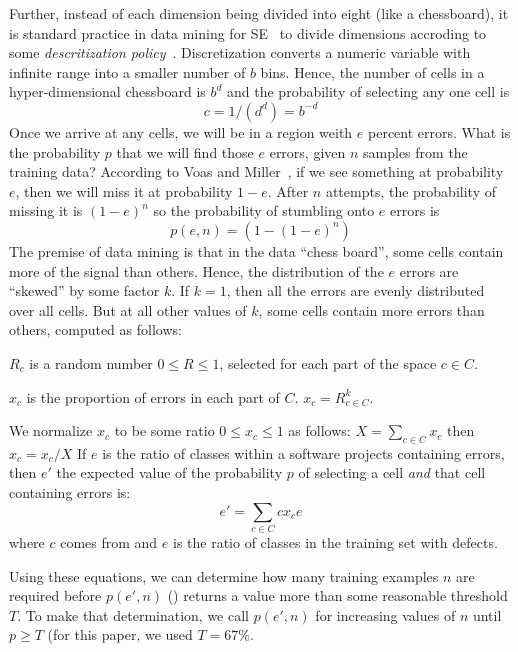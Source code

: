 Further,
instead of each dimension being divided into eight (like a chessboard), it is standard practice in data mining for SE~\cite{Menzies2014a}
to divide dimensions accroding to some {\em descritization policy}~\cite{lust08}.
Discretization converts a numeric variable with infinite range into a smaller number of  $b$ bins. Hence, the number of cells in a
hyper-dimensional chessboard is $b^d$ and the probability of selecting any one cell is
\begin{equation}\label{eq:c}c=1/(d^d)=b^{-d}\end{equation}
Once we arrive at any cells, we will be in a region weith $e$ percent errors.
What  is the probability $p$ that we will find those $e$ errors, given $n$ samples from the training data?
According to Voas and Miller~\cite{voas1995software},
if we see something at probability $e$, then we will miss it at probability $1-e$.
After $n$ attempts, the probability of missing it is $(1-e)^n$ so the probability of stumbling onto $e$ errors is
\begin{equation}\label{eq:p}
p(e,n) = (1-(1-e)^n)
\end{equation}
The premise of data mining is that in the data ``chess board'', some cells contain more of the signal than others. Hence, the 
distribution of the $e$ errors are ``skewed'' by some factor $k$. If $k=1$, then all the errors are evenly distributed over all cells.
But at all other values of $k$, some cells contain more errors than others, computed as follows:
    \bi
  \item $R_c$ is a random number $0\le R \le 1$, selected for each part of the space $c\in C$.
  \item $x_c$ is the proportion of errors in each part of $C$. \mbox{$x_c =  R_{c\in C}^k$}.
  \item We normalize $x_c$ to be some ratio $0 \le x_c \le 1$ as follows: $X= \sum_{c\in C} x_c$ then $x_c = x_c/X$
    \ei
    If  $e$ is the ratio of classes within a software projects containing errors, then $e'$ 
    the expected value of the probability $p$ of selecting a cell {\em and} that cell containing errors is:
    \begin{equation}\label{eq:p}
      e' = \sum_{c\in C}cx_ce
    \end{equation}
    where $c$ comes from  and $e$ is the ratio of classes in the training set with defects.

Using these equations, we can determine how many training examples $n$ are required before 
  $p(e',n)$ () returns a value more than some reasonable threshold $T$.
  To make that determination, we call $p(e',n)$ for increasing values of $n$ until $p \ge T$
  (for this paper, we used $T = 67\%$.

